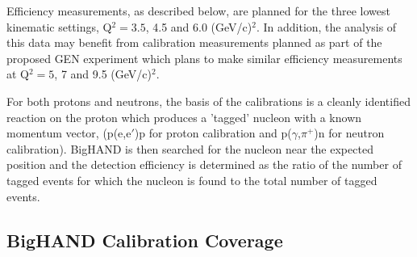 \documentclass[12pt,letterpaper,oneside]{article}
\begin{document}
Efficiency measurements, as described below, are planned for the three
lowest kinematic settings, Q$^2 = 3.5$, 4.5 and 6.0 (GeV/c)$^2$. In
addition, the analysis of this data may benefit from calibration
measurements planned as part of the proposed GEN experiment
\cite{new_GEN} which plans to make similar efficiency measurements at 
Q$^2 = 5$, 7 and 9.5 (GeV/c)$^2$. 

For both protons and neutrons, the basis of the calibrations is a
cleanly identified reaction on the proton which produces a 'tagged'
nucleon with a known momentum vector, (p(e,e$'$)p for proton
calibration and p($\gamma$,$\pi^+$)n for neutron calibration).  
BigHAND is then searched for
the nucleon near the expected position and the detection efficiency is
determined as the ratio of the number of tagged events for which the
nucleon is found to the total number of tagged events.

\subsection{BigHAND Calibration Coverage}
\end{document}
